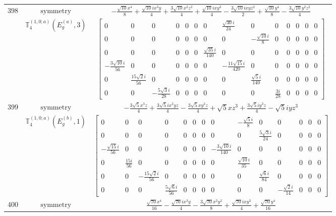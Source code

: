 \documentclass[fleqn,8pt,landscape]{jsarticle}
\begin{document}
\begin{longtable}{ccc}
$ 398 $ & $ \text{symmetry} $ & $ - \frac{\sqrt{10} x^{4}}{8} + \frac{\sqrt{10} i x^{3} y}{4} + \frac{3 \sqrt{10} x^{2} z^{2}}{4} + \frac{\sqrt{10} i x y^{3}}{4} - \frac{3 \sqrt{10} i x y z^{2}}{2} + \frac{\sqrt{10} y^{4}}{8} - \frac{3 \sqrt{10} y^{2} z^{2}}{4} $ \\
$  $ & $ \mathbb{T}_{4}^{(1,0;a)}(E_{g}^{(a)},3) $ & $ \begin{bmatrix} 0 & 0 & 0 & 0 & 0 & 0 & 0 & \frac{\sqrt{30} i}{24} & 0 & 0 & 0 & 0 & 0 & 0 \\ 0 & 0 & 0 & 0 & 0 & 0 & 0 & 0 & - \frac{\sqrt{10} i}{8} & 0 & 0 & 0 & 0 & 0 \\ 0 & 0 & 0 & 0 & 0 & 0 & \frac{\sqrt{35} i}{140} & 0 & 0 & 0 & 0 & 0 & 0 & 0 \\ - \frac{3 \sqrt{10} i}{56} & 0 & 0 & 0 & 0 & 0 & 0 & - \frac{11 \sqrt{15} i}{420} & 0 & 0 & 0 & 0 & 0 & 0 \\ 0 & \frac{15 \sqrt{2} i}{56} & 0 & 0 & 0 & 0 & 0 & 0 & \frac{\sqrt{5} i}{140} & 0 & 0 & 0 & 0 & 0 \\ 0 & 0 & - \frac{5 \sqrt{3} i}{28} & 0 & 0 & 0 & 0 & 0 & 0 & \frac{3 i}{28} & 0 & 0 & 0 & 0 \end{bmatrix} $ \\ \hline
$ 399 $ & $ \text{symmetry} $ & $ - \frac{3 \sqrt{5} x^{3} z}{4} + \frac{3 \sqrt{5} i x^{2} y z}{4} - \frac{3 \sqrt{5} x y^{2} z}{4} + \sqrt{5} x z^{3} + \frac{3 \sqrt{5} i y^{3} z}{4} - \sqrt{5} i y z^{3} $ \\
$  $ & $ \mathbb{T}_{4}^{(1,0;a)}(E_{g}^{(b)},1) $ & $ \begin{bmatrix} 0 & 0 & 0 & 0 & 0 & 0 & 0 & 0 & - \frac{\sqrt{5} i}{8} & 0 & 0 & 0 & 0 & 0 \\ 0 & 0 & 0 & 0 & 0 & 0 & 0 & 0 & 0 & \frac{5 \sqrt{3} i}{24} & 0 & 0 & 0 & 0 \\ - \frac{\sqrt{15} i}{56} & 0 & 0 & 0 & 0 & 0 & 0 & - \frac{3 \sqrt{10} i}{140} & 0 & 0 & 0 & 0 & 0 & 0 \\ 0 & \frac{15 i}{56} & 0 & 0 & 0 & 0 & 0 & 0 & \frac{\sqrt{10} i}{35} & 0 & 0 & 0 & 0 & 0 \\ 0 & 0 & - \frac{15 \sqrt{2} i}{56} & 0 & 0 & 0 & 0 & 0 & 0 & \frac{\sqrt{6} i}{84} & 0 & 0 & 0 & 0 \\ 0 & 0 & 0 & \frac{5 \sqrt{6} i}{56} & 0 & 0 & 0 & 0 & 0 & 0 & - \frac{\sqrt{2} i}{14} & 0 & 0 & 0 \end{bmatrix} $ \\ \hline
$ 400 $ & $ \text{symmetry} $ & $ \frac{\sqrt{70} x^{4}}{16} - \frac{\sqrt{70} i x^{3} y}{4} - \frac{3 \sqrt{70} x^{2} y^{2}}{8} + \frac{\sqrt{70} i x y^{3}}{4} + \frac{\sqrt{70} y^{4}}{16} $ \\

\end{longtable}
\end{document}
